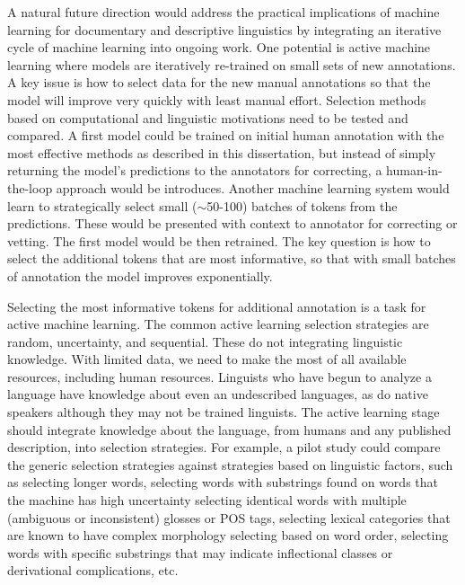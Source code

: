 A natural future direction would address the practical implications of machine learning for documentary and descriptive linguistics by integrating an iterative cycle of machine learning into ongoing work.  One potential is active machine learning where models are iteratively re-trained on small sets of new annotations. A key issue is how to select data for the new manual annotations so that the model will improve very quickly with least manual effort. Selection methods based on computational and linguistic motivations need to be tested and compared. 
A first model could be trained on initial human annotation with the most effective methods as described in this dissertation, but instead of simply returning the model's predictions to the annotators for correcting, a human-in-the-loop approach would be introduces. Another machine learning system would learn to strategically select small ($\sim$50-100) batches of tokens from the predictions. These would be presented with context to annotator for correcting or vetting. The first model would be then retrained. The key question is how to select the additional tokens that are most informative, so that with small batches of annotation the model improves exponentially. 

Selecting the most informative tokens for additional annotation is a task for active machine learning. The common active learning selection strategies are random, uncertainty, and sequential. These do not integrating linguistic knowledge. With limited data, we need to make the most of all available resources, including human resources. Linguists who have begun to analyze a language have knowledge about even an undescribed languages, as do native speakers although they may not be trained linguists. The active learning stage should integrate knowledge about the language, from humans and any published description, into selection strategies. For example, a pilot study could compare the generic selection strategies against strategies based on linguistic factors, such as selecting longer words, selecting words with substrings found on words that the machine has high uncertainty 
selecting identical words with multiple (ambiguous or inconsistent) glosses 
or POS tags, selecting lexical categories that are known to have complex morphology
selecting based on word order, selecting words with specific substrings that may indicate inflectional classes or derivational complications, etc. 

